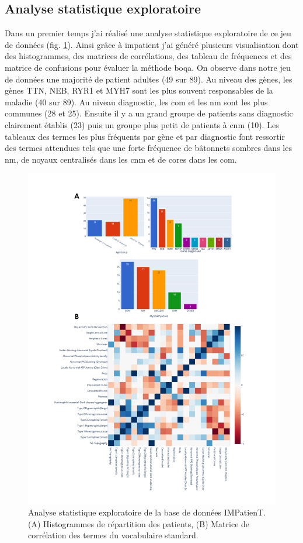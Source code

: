 \subsection{Analyse statistique exploratoire}
Dans un premier temps j'ai réalisé une analyse statistique exploratoire de ce jeu de données (fig. \ref{fig:impatient_eda}). Ainsi grâce à \gls{impatient} j'ai généré plusieurs visualisation dont des histogrammes, des matrices de corrélations, des tableau de fréquences et des matrice de confusions pour évaluer la méthode \gls{boqa}.  On observe dans notre jeu de données une majorité de patient adultes (49 sur 89). Au niveau des gènes, les gènes TTN, NEB, RYR1 et MYH7 sont les plus souvent responsables de la maladie (40 sur 89). Au niveau diagnostic, les \gls{com} et les \gls{nm} sont les plus communes (28 et 25). Ensuite il y a un grand groupe de patients sans diagnostic clairement établis (23) puis un groupe plus petit de patients à \gls{cnm} (10). Les tableaux des termes les plus fréquents par gène et par diagnostic font ressortir des termes attendues tels que une forte fréquence de bâtonnets sombres dans les \gls{nm}, de noyaux centralisés dans les \gls{cnm} et de cores dans les \gls{com}.
\begin{figure}[htbp]
  \centering
  \includegraphics[width=1\textwidth]{figures/impatient_explo.png}
  \caption[Analyse statistique exploratoire IMPatienT]{Analyse statistique exploratoire de la base de données IMPatienT. (A) Histogrammes de répartition des patients, (B) Matrice de corrélation des termes du vocabulaire standard.}
  \label{fig:impatient_eda}
\end{figure}
